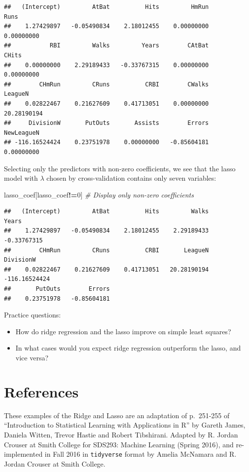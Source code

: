 \documentclass[
  openany]{book}
\newenvironment{Shaded}{\begin{snugshade}}{\end{snugshade}}
\newcommand{\CommentTok}[1]{\textcolor[rgb]{0.56,0.35,0.01}{\textit{#1}}}
\newcommand{\DecValTok}[1]{\textcolor[rgb]{0.00,0.00,0.81}{#1}}
\newcommand{\NormalTok}[1]{#1}
\newcommand{\OperatorTok}[1]{\textcolor[rgb]{0.81,0.36,0.00}{\textbf{#1}}}
\providecommand{\tightlist}{%
  \setlength{\itemsep}{0pt}\setlength{\parskip}{0pt}}
\begin{document}
\begin{verbatim}
##   (Intercept)         AtBat          Hits         HmRun          Runs 
##    1.27429897   -0.05490834    2.18012455    0.00000000    0.00000000 
##           RBI         Walks         Years        CAtBat         CHits 
##    0.00000000    2.29189433   -0.33767315    0.00000000    0.00000000 
##        CHmRun         CRuns          CRBI        CWalks       LeagueN 
##    0.02822467    0.21627609    0.41713051    0.00000000   20.28190194 
##     DivisionW       PutOuts       Assists        Errors    NewLeagueN 
## -116.16524424    0.23751978    0.00000000   -0.85604181    0.00000000
\end{verbatim}

Selecting only the predictors with non-zero coefficients, we see that the lasso model with \(\lambda\)
chosen by cross-validation contains only seven variables:

\begin{Shaded}
\begin{Highlighting}[]
\NormalTok{lasso_coef[lasso_coef}\OperatorTok{!=}\DecValTok{0}\NormalTok{] }\CommentTok{# Display only non-zero coefficients}
\end{Highlighting}
\end{Shaded}

\begin{verbatim}
##   (Intercept)         AtBat          Hits         Walks         Years 
##    1.27429897   -0.05490834    2.18012455    2.29189433   -0.33767315 
##        CHmRun         CRuns          CRBI       LeagueN     DivisionW 
##    0.02822467    0.21627609    0.41713051   20.28190194 -116.16524424 
##       PutOuts        Errors 
##    0.23751978   -0.85604181
\end{verbatim}

Practice questions:

\begin{itemize}
\tightlist
\item
  How do ridge regression and the lasso improve on simple least squares?
\item
  In what cases would you expect ridge regression outperform the lasso, and vice versa?
\end{itemize}

\hypertarget{references}{%
\section{References}\label{references}}

These examples of the Ridge and Lasso are an adaptation of p.~251-255 of ``Introduction to
Statistical Learning with Applications in R'' by Gareth James, Daniela Witten, Trevor Hastie and Robert
Tibshirani. Adapted by R. Jordan Crouser at Smith College for SDS293: Machine Learning (Spring 2016), and re-implemented in Fall 2016 in \texttt{tidyverse} format by Amelia McNamara and R. Jordan Crouser at Smith College.
\end{document}
